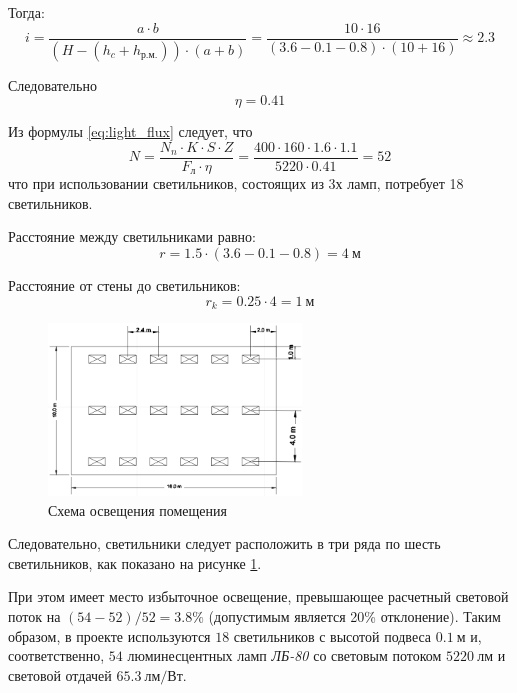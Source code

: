 Тогда:
$$
    i = \frac{a \cdot b}{(H - (h_c + h_{р.м.}))\cdot(a + b)} = \frac{10 \cdot 16}{(3.6 - 0.1 - 0.8) \cdot (10 + 16)} \approx 2.3
$$

Следовательно $$ \eta = 0.41 $$

Из формулы \ref{eq:light_flux} следует, что
$$ N = \frac{N_n \cdot K \cdot S \cdot Z}{F_л \cdot \eta} = \frac{400 \cdot 160 \cdot 1.6 \cdot 1.1}{5220 \cdot 0.41} = 52 $$
что при использовании светильников, состоящих из 3х ламп, потребует 18 светильников.

Расстояние между светильниками равно:
$$
    r = 1.5 \cdot (3.6 - 0.1 - 0.8) = 4\ м
$$

Расстояние от стены до светильников:
$$ r_k = 0.25 \cdot 4 = 1\ м $$
\begin{figure}[htb!]
\centering
\includegraphics[width=0.6\textwidth]{lights}
\caption{Схема освещения помещения}
\label{pic:lights}
\end{figure}

Следовательно, светильники следует расположить в три ряда по шесть светильников, как показано на рисунке \ref{pic:lights}.

При этом имеет место избыточное освещение, превышающее расчетный световой поток на $(54-52) / 52=3.8\%$ (допустимым является 20\%
        отклонение).
Таким образом, в проекте используются $18$ светильников с высотой подвеса $0.1\ м$ и, соответственно, $54$ люминесцентных ламп
\textit{ЛБ-80} со
световым потоком $5220\ лм$ и световой отдачей $65.3\ лм/Вт$.

